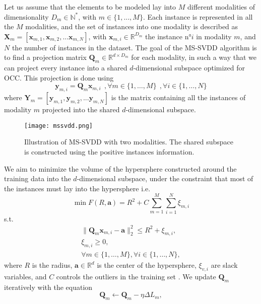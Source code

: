 Let us assume that the elements to be modeled lay into $M$ different modalities of dimensionality $D_m \in \mathbb{N^{*}}$, with $m \in \{1, ..., M\}$. Each instance is represented in all the $M$ modalities, and the set of instances into one modality is described as $\mathbf{X}_m = [\mathbf{x}_{m,1}, \mathbf{x}_{m,2}, ... \mathbf{x}_{m,N}]$, with $\mathbf{x}_{m,i} \in \mathbb{R}^{D_m}$ the instance n°$i$ in modality $m$, and $N$ the number of instances in the dataset.
The goal of the MS-SVDD algorithm is to find a projection matrix $\mathbf{Q}_m \in \mathbb{R}^{d \times D_m}$ for each modality, in such a way that we can project every instance into a shared $d$-dimensional subspace optimized for OCC. This projection is done using  
\begin{equation}\label{eq:Y_i}
\mathbf{y}_{m,i} = \mathbf{Q}_m \mathbf{x}_{m,i} \:\:,\forall m \in \{1,\dots,M\} \:\:, \forall i \in \{1,\dots,N\}
\end{equation}
where $\mathbf{Y}_m = [\mathbf{y}_{m,1}, \mathbf{y}_{m,2}, ... \mathbf{y}_{m,N}]$ is the matrix containing all the instances of modality $m$ projected into the shared $d$-dimensional subspace.
\begin{figure}[t]
    \centering
    \texttt{[image: mssvdd.png]}
    \caption{Illustration of MS-SVDD with two modalities. The shared subspace is constructed using the positive instances information.}
    \label{fig:mssvdd}
\end{figure}
We aim to minimize the volume of the hypersphere constructed around the training data into the $d$-dimensional subspace, under the constraint that most of the instances must lay into the hypersphere i.e.
\begin{equation}\label{eq:F_R_a}
\min F(R,\textbf{a}) = R^2 + C\sum_{m=1}^{M}\sum_{i=1}^{N} \xi_{m,i}\nonumber
\end{equation}
s.t.
\begin{eqnarray}\label{eq:F_R_a_st}
\| {\mathbf{Q}_m\mathbf{x}_{m,i}} - \mathbf{a} \|^2_{2} \le R^2 + \xi_{m,i},\\
\xi_{m,i} \ge 0,\nonumber \\
\forall m \in \{1,\dots,M\}, \forall i \in \{1,\dots,N\} ,\nonumber 
\end{eqnarray}
where $R$ is the radius, $\mathbf{a} \in \mathbb{R}^d$ is the center of the hypersphere, $\xi_{v,i}$ are slack variables, and $C$ controls the outliers in the training set \cite{10081907}. We update $\mathbf{Q}_m$ iteratively with the equation 
\begin{equation}\label{eq:Q_m_update}
\mathbf{Q}_m \leftarrow \mathbf{Q}_m - \eta \Delta L_m,
\end{equation}
